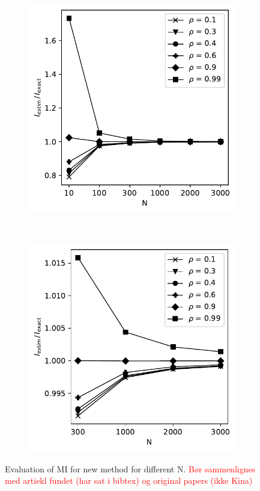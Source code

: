 \documentclass[../Thesis.tex]{subfiles}
\begin{document}
\begin{figure}[h]
    \centering
    \begin{subfigure}[t]{0.49\textwidth}
        \centering
        \includegraphics[width=\linewidth]{figures/ND examples/MI calc/gaussian example all.pdf}
        \caption{}
        \label{subfig:d}
    \end{subfigure}%
    ~
    \begin{subfigure}[t]{0.49\textwidth}
        \centering
        \includegraphics[width=\linewidth]{figures/ND examples/MI calc/gaussian example zoom.pdf}
        \caption{}
        \label{subfig:dd}
    \end{subfigure}
    \caption{Evaluation of MI for new method for different N. \textcolor{red}{Bør sammenlignes med artiekl fundet (har sat i bibtex) og original papers (ikke Kina)}}
    \label{fig:dd}
\end{figure}
\end{document}
